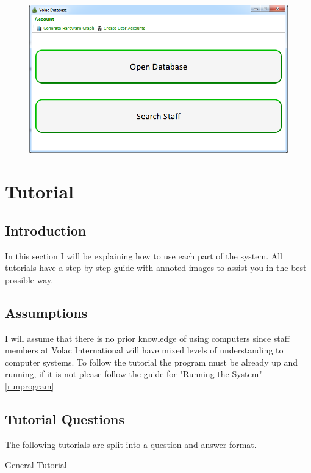 \begin{figure}[H]
    \includegraphics[width=\textwidth]{./Manual/Images/run7.png}
\end{figure}

\section{Tutorial}

\subsection{Introduction}

In this section I will be explaining how to use each part of the system. All tutorials have a step-by-step guide with annoted images to assist you in the best possible way.

\subsection{Assumptions}

I will assume that there is no prior knowledge of using computers since staff members at Volac International will have mixed levels of understanding to computer systems. To follow the tutorial the program must be already up and running, if it is not please follow the guide for "Running the System" \ref{runprogram}

\subsection{Tutorial Questions}

The following tutorials are split into a question and answer format.

General Tutorial

